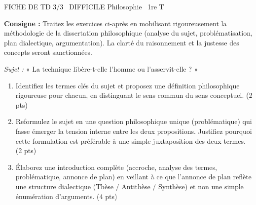 \documentclass[11pt]{article}
\begin{document}
\begin{tcolorbox}[enhanced,colback=popink,colframe=popink,arc=10pt,boxrule=0pt,left=12pt,right=12pt,top=9pt,bottom=9pt]
{\color{white}\popxbold\small FICHE DE TD 3/3 \textbullet\ DIFFICILE \hfill Philosophie \textbullet\ 1re T\par}
\end{tcolorbox}
\vspace{4pt}
\noindent\textbf{Consigne :} Traitez les exercices ci-après en mobilisant rigoureusement la méthodologie de la dissertation philosophique (analyse du sujet, problématisation, plan dialectique, argumentation). La clarté du raisonnement et la justesse des concepts seront sanctionnées.

\begin{exercice}
\textit{Sujet :} « La technique libère-t-elle l'homme ou l'asservit-elle ? »
\begin{enumerate}
    \item Identifiez les termes clés du sujet et proposez une définition philosophique rigoureuse pour chacun, en distinguant le sens commun du sens conceptuel. (2 pts)
    \item Reformulez le sujet en une question philosophique unique (problématique) qui fasse émerger la tension interne entre les deux propositions. Justifiez pourquoi cette formulation est préférable à une simple juxtaposition des deux termes. (2 pts)
    \item Élaborez une introduction complète (accroche, analyse des termes, problématique, annonce de plan) en veillant à ce que l'annonce de plan reflète une structure dialectique (Thèse / Antithèse / Synthèse) et non une simple énumération d'arguments. (4 pts)
\end{enumerate}
\end{exercice}
\end{document}
